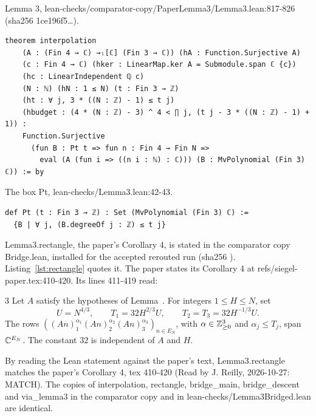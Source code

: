 \begin{listing}[tbp]
\caption{Lemma 3, lean-checks/\allowbreak comparator-copy/\allowbreak PaperLemma3/\allowbreak Lemma3.lean:817-826 (sha256 1ce196f5\ldots).}\label{lst:interpolation} %
\begin{Verbatim}
theorem interpolation
    (A : (Fin 4 → ℂ) →ₗ[ℂ] (Fin 3 → ℂ)) (hA : Function.Surjective A)
    (c : Fin 4 → ℂ) (hker : LinearMap.ker A = Submodule.span ℂ {c})
    (hc : LinearIndependent ℚ c)
    (N : ℕ) (hN : 1 ≤ N) (t : Fin 3 → ℤ)
    (ht : ∀ j, 3 * ((N : ℤ) - 1) ≤ t j)
    (hbudget : (4 * (N : ℤ) - 3) ^ 4 < ∏ j, (t j - 3 * ((N : ℤ) - 1) + 1)) :
    Function.Surjective
      (fun B : Pt t => fun n : Fin 4 → Fin N =>
        eval (A (fun i => ((n i : ℕ) : ℂ))) (B : MvPolynomial (Fin 3) ℂ)) := by
\end{Verbatim}
\end{listing}

\begin{listing}[tbp]
\caption{The box Pt, lean-checks/Lemma3.lean:42-43.}\label{lst:pt} %
\begin{Verbatim}
def Pt (t : Fin 3 → ℤ) : Set (MvPolynomial (Fin 3) ℂ) :=
  {B | ∀ j, (B.degreeOf j : ℤ) ≤ t j}
\end{Verbatim}
\end{listing}

Lemma3.rectangle, the paper's Corollary 4, is stated in the comparator copy Bridge.lean, installed for the accepted rerouted run (sha256 ). %
Listing~\ref{lst:rectangle} quotes it. %
The paper states its Corollary 4 at refs/siegel-paper.tex:410-420. %
Its lines 411-419 read: %
\begin{paperquote}{}
\expandafter\def\csname paperref@lem:interpolation\endcsname{3}\renewcommand{\ref}[1]{\csname paperref@#1\endcsname}%
Let $A$ satisfy the hypotheses of Lemma~\ref{lem:interpolation}.
For integers $1\le H\le N$, set
\[
 U=N^{4/3},\qquad T_1=32H^{2/3}U,
 \qquad T_2=T_3=32H^{-1/3}U.
\]
The rows $((An)_1^{\alpha_1}(An)_2^{\alpha_2}(An)_3^{\alpha_3})_{n\in E_N}$,
with $\alpha\in\mathbb Z_{\ge0}^3$ and $\alpha_j\le T_j$, span $\mathbb C^{E_N}$.
The constant $32$ is independent of $A$ and $H$.
\end{paperquote}
By reading the Lean statement against the paper's text, Lemma3.rectangle matches the paper's Corollary 4, tex 410-420 (Read by J. Reilly, 2026-10-27: MATCH). %
The copies of interpolation, rectangle, bridge\_main, bridge\_descent and via\_lemma3 in the comparator copy and in lean-checks/Lemma3Bridged.lean are identical. %

